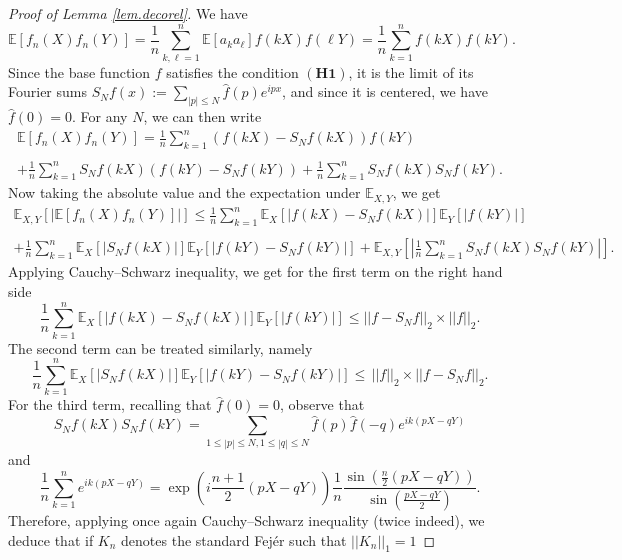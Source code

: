 \documentclass{svproc}
\begin{document}
\begin{proof}[Proof of Lemma \ref{lem.decorel}]
We have
\[
\mathbb E[f_n(X)f_n(Y)]=\frac{1}{n}\sum_{k,\ell=1}^{n}\mathbb E[a_ka_{\ell}]f(kX)f(\ell Y)=\frac{1}{n}\sum_{k=1}^{n}f(kX)f(kY).
\]
{Since the base function $f$ satisfies the condition $\mathbf{(H1)}$, it is the limit of its Fourier sums $S_N f(x):=\sum_{|p| \leq N} \widehat{f}(p) e^{i p x}$, and since it is centered, we have $ \widehat{f}(0) =0$}. For any $N$, we can then write 
\[
\begin{array}{ll}
\mathbb E[f_n(X)f_n(Y)]  =\displaystyle{\frac{1}{n}\sum_{k=1}^{n} \left( f(kX)-S_N f(kX)\right) f(kY)}\\
\\
  + \displaystyle{\frac{1}{n}\sum_{k=1}^{n} S_N f(kX) \left(f(kY)-S_N f(kY)\right)
  +\frac{1}{n}\sum_{k=1}^{n} S_N f(kX) S_N f(kY).}
\end{array}
\]
Now taking the absolute value and the expectation under $\mathbb E_{X,Y}$, we get 
\[
\begin{array}{l}
\mathbb E_{X,Y} \left[ \left|\mathbb E[f_n(X)f_n(Y)] \right|\right] \leq \displaystyle{\frac{1}{n}\sum_{k=1}^{n} \mathbb E_X\left[ \left| f(kX)-S_N f(kX)\right|\right] \mathbb E_Y \left[\left|f(kY)\right|\right]}\\
\\
  + \displaystyle{\frac{1}{n}\sum_{k=1}^{n} \mathbb E_X\left[|S_N f(kX)| \right] \mathbb E_Y\left[ |f(kY)-S_N f(kY)|\right]} 
+ \displaystyle{\mathbb E_{X,Y}\left[ \left| \frac{1}{n}\sum_{k=1}^{n} S_N f(kX) S_N f(kY)\right|\right].}
\end{array}
\]
Applying Cauchy--Schwarz inequality, we get for the first term on the right hand side
\[
\frac{1}{n}\sum_{k=1}^{n} \mathbb E_X\left[ \left| f(kX)-S_N f(kX)\right|\right] \mathbb E_Y \left[\left|f(kY)\right|\right] \leq   ||f-S_Nf ||_2 \times ||f||_2.
\]
The second term can be treated similarly, namely 
\[
\frac{1}{n}\sum_{k=1}^{n} \mathbb E_X\left[|S_N f(kX)| \right] \mathbb E_Y\left[ |f(kY)-S_N f(kY)|\right]\leq \, ||f||_2 \times  ||f-S_Nf ||_2.
\]
For the third term, {recalling that $ \widehat{f}(0)=0$}, observe that 
\[
S_Nf(kX) S_Nf(k Y)
= \sum_{1\leq |p|\leq N,1\leq |q|\leq N}\widehat{f}(p)\widehat{f}(-q)e^{ik(pX-qY)} 
\]
and
$$\frac{1}{n}\sum_{k=1}^{n}e^{ik(pX-qY)}=\exp\left(i\frac{n+1}{2}(pX-qY)\right)\frac{1}{n}\frac{\sin\left(\frac{n}{2}(pX-qY)\right)}{\sin\left(\frac{pX-qY}{2}\right)}.$$
Therefore, applying once again Cauchy--Schwarz inequality (twice indeed), we deduce that if $K_n$ denotes the standard Fej\'er such that $||K_n||_1=1$

\end{proof}
\end{document}
